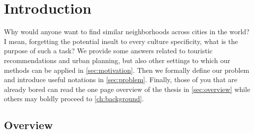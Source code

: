 \chapter{Introduction}
\label{ch:introduction}

Why would anyone want to find similar neighborhoods across cities in the world?
I mean, forgetting the potential insult to every culture specificity, what is
the purpose of such a task? We provide some answers related to touristic
recommendations and urban planning, but also other settings to which our
methods can be applied in \autoref{sec:motivation}. Then we formally define our
problem and introduce useful notations in \autoref{sec:problem}. Finally, those
of you that are already bored can read the one page overview of the thesis in
\autoref{sec:overview} while others may boldly proceed to
\autoref{ch:background}.



\section{Overview}
\label{sec:overview}
% 

